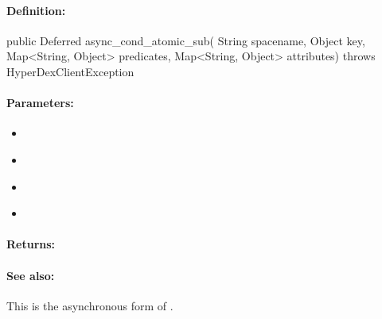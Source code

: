 \paragraph{Definition:}
\begin{javacode}
public Deferred async_cond_atomic_sub(
        String spacename,
        Object key,
        Map<String, Object> predicates,
        Map<String, Object> attributes) throws HyperDexClientException
\end{javacode}

\paragraph{Parameters:}
\begin{itemize}[noitemsep]
\item {}\\

\item {}\\

\item {}\\

\item {}\\

\end{itemize}

\paragraph{Returns:}


\paragraph{See also:}  This is the asynchronous form of .

\pagebreak
\subsubsection{}
\label{api:java:group_atomic_mul}


